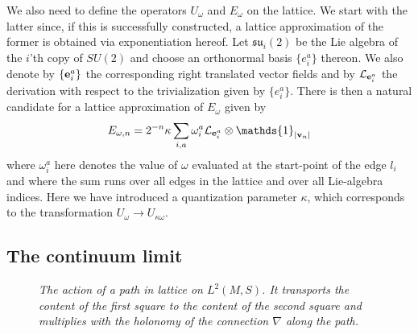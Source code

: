 \documentclass[12pt]{article}
\def\oo{\omega}
\def\cl{{\cal L}}
\begin{document}
We also need to define the operators $U_\omega$ and $E_\omega$ on the lattice. We start with the latter since, if this is successfully constructed, a lattice approximation of the former is obtained via exponentiation hereof. 
Let $\mathfrak{su}_i(2)$ be the Lie algebra of the $i$'th copy of $SU(2)$ and choose an orthonormal basis $\{e_i^a\}$ thereon.  We also denote by $\{{\bf e}_i^a\}$ the corresponding right translated vector fields and by $\cl_{{\bf e}_i^a}$ the derivation with respect to the trivialization given by $\{e_i^a\}$. 
There is then a natural candidate for  a lattice approximation of $E_\oo$ given by 
$$
 E_{\oo,n}=  2^{-n}\kappa \sum_{i,a} \oo_i^a   \cl_{{\bf e}_i^a} \otimes \mathds{1}_{\vert {\bf v}_n\vert }
$$
where $\oo_i^a$ here denotes the value of $\oo$ evaluated at the start-point of the edge $l_i$ and where the sum runs over all edges in the lattice and over all Lie-algebra indices. Here we have introduced a quantization parameter $\kappa$, which corresponds to the transformation $U_\oo\rightarrow U_{\kappa \oo}$.














\subsection{The continuum limit}
\label{continuum}


\begin{figure}[t]
\begin{center}
\resizebox{!}{ 6 cm}{
 }
\end{center}
\caption{\it The action of a path in lattice on $L^2(M,S)$. It transports the content of the first square to the content of the second square and multiplies with the holonomy of the connection $\nabla$ along the path.}
 \label{brian}
\end{figure}
\end{document}
